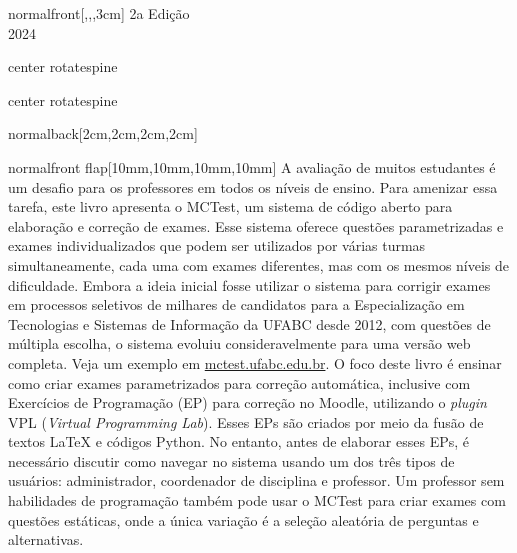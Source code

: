 \documentclass[
    coverwidth=21cm,  %
    coverheight=29.7cm, %
    spinewidth=12mm,  %
    flapwidth=8cm,    %
    wrapwidth=0mm,    %
    ]{bookcover}
\begin{document}
\begin{bookcover}
\begin{bookcoverelement}{normal}{front}[,,,3cm]
{\centering
\color{green!30!black!80}\Large 2a Edição \\ 2024}

\end{bookcoverelement}


\begin{bookcoverelement}{center rotate}{spine}
    \color{yellow}\sffamily\bfseries
\end{bookcoverelement}

\begin{bookcoverelement}{center rotate}{spine}
    \color{yellow}\sffamily\bfseries
\end{bookcoverelement}

\begin{bookcoverelement}{normal}{back}[2cm,2cm,2cm,2cm]
    \color{white}%
\end{bookcoverelement}

\begin{bookcoverelement}{normal}{front flap}[10mm,10mm,10mm,10mm]
    \color{black}\large
A avaliação de muitos estudantes é um desafio para os professores em todos os níveis de ensino. Para ame\-nizar essa tarefa, este livro apresenta o MCTest, um sistema de código aberto para elaboração e correção de exa\-mes. Esse sistema oferece questões parametrizadas e exa\-mes indivi\-dualizados que podem ser utilizados por várias turmas simulta\-neamente, cada uma com exames diferentes, mas com os mesmos níveis de dificuldade.
%
Embora a ideia inicial fosse utilizar o sistema para corrigir exames em processos seletivos de mi\-lhares de candidatos para a Especia\-lização em Tecnologias e Sistemas de Informação da UFABC desde 2012, com questões de múltipla escolha, o sistema evoluiu considera\-velmente para uma versão web completa. Veja um exemplo em \url{mctest.ufabc.edu.br}.
%
O foco deste livro é ensinar como criar exames parametrizados para correção automática, inclusive com Exercícios de Programação (EP) para correção no Moodle, utilizando o \textit{plugin} VPL (\textit{Virtual Programming Lab}). Esses EPs são criados por meio da fusão de tex\-tos \LaTeX{} e códigos Python.
%
No entanto, antes de elaborar esses EPs, é necessário discutir como navegar no sistema usando um dos três tipos de usuários: administrador, coordenador de disciplina e professor. Um professor sem habilidades de programação também pode usar o MCTest para criar exames com questões estáticas, onde a única variação é a seleção aleatória de perguntas e alternativas. %
\end{bookcoverelement}


\end{bookcover}
\end{document}
